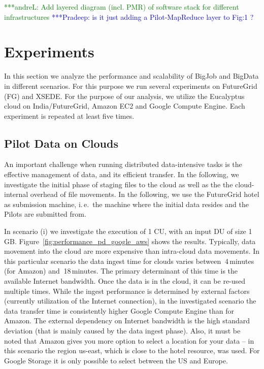 \documentclass[times]{cpeauth}
\newcommand{\alnote}[1]{ {\textcolor{green} { ***andreL: #1 }}}
\newcommand{\pmnote}[1]{ {\textcolor{blue} { ***Pradeep: #1 }}}
\newcommand{\alnote}[1]{}
\newcommand{\pmnote}[1]{}
\newcommand{\pilots}{Pilots\xspace}
\newcommand{\du}{DU\xspace}
\newcommand{\cu}{CU\xspace}
\begin{document}
\alnote{Add layered diagram (incl. PMR) of software stack for different 
infrastructures}
\pmnote{ is it just adding a Pilot-MapReduce layer to Fig:1 ? }

\section{Experiments}

In this section we analyze the performance and scalability of BigJob and 
BigData in different scenarios. For this purpose we run several experiments on 
FutureGrid (FG) and XSEDE. For the purpose of our analysis, we utilize the 
Eucalyptus cloud on India/FutureGrid, Amazon EC2 and Google Compute Engine. 
Each experiment is repeated at least five times.

	
\subsection{Pilot Data on Clouds}

An important challenge when running distributed data-intensive tasks is the 
effective management of data, and its efficient transfer. In the following, we 
investigate the initial phase of staging files to the cloud as well as the 
the cloud-internal overhead of file movements.  In the following, we use the 
FutureGrid hotel as submission machine, i.\,e.\ the machine where the initial 
data resides and the \pilots are submitted from.

In scenario (i) we investigate the execution of 1 \cu, with an input \du of
size 1\,GB. Figure~\ref{fig:performance_pd_google_aws} shows the results.
Typically, data movement into the cloud are more expensive than intra-cloud
data movements. In this particular scenario the data ingest time for clouds
varies between $~$4\,minutes (for Amazon) and $~$18\,minutes. The primary
determinant of this time is the available Internet bandwidth. Once the data is
in the cloud, it can be re-used multiple times. While the ingest performance
is determined by external factors (currently utilization of the Internet
connection), in the investigated scenario the data transfer time is
consistently higher Google Compute Engine than for Amazon. The external
dependency on Internet bandwidth is the high standard deviation (that is
mainly caused by the data ingest phase). Also, it must be noted that Amazon
gives you more option to select a location for your data -- in this scenario
the region us-east, which is close to the hotel resource, was used. For Google 
Storage it is only possible to select between the US and Europe.
\end{document}

